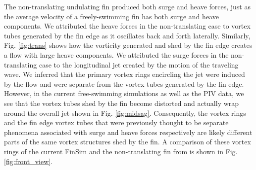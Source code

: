 \documentclass[onecolumn]{IEEEtran}
\begin{document}
The non-translating undulating fin produced both surge and heave forces,
just as the average velocity of a freely-swimming fin has both surge and
heave components. We attributed the heave forces in the non-translating
case to vortex tubes generated by the fin edge as it oscillates back and
forth laterally. Similarly, Fig. \ref{fig:trans} shows how the vorticity
generated and shed by the fin edge creates a flow with large heave
components. We attributed the surge forces in the non-translating case to
the longitudinal jet created by the motion of the traveling wave. We
inferred that the primary vortex rings encircling the jet were induced by
the flow and were separate from the vortex tubes generated by the fin
edge. However, in the current free-swimming simulations as well as the PIV
data, we see that the vortex tubes shed by the fin become distorted and
actually wrap around the overall jet shown in Fig. \ref{fig:midsag}.
Consequently, the vortex rings and the fin edge vortex tubes that 
were previously thought to be separate phenomena associated 
with surge and heave forces respectively are likely different parts 
of the same vortex structures shed by the fin. A
comparison of these vortex rings of the current FinSim and the
non-translating fin from \citet*{Shir08a} is shown in Fig.
\ref{fig:front_view}.
\end{document}
